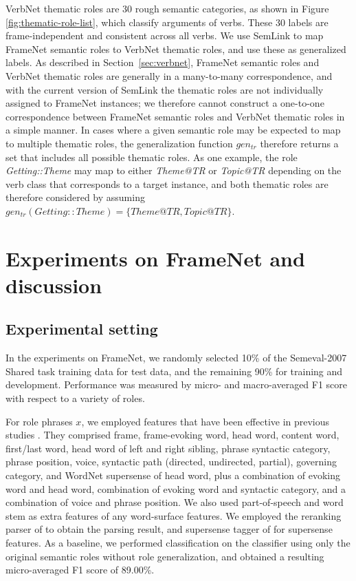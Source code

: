\documentclass[english]{jnlp_1.4_rep}
\begin{document}
VerbNet thematic roles are 30 rough semantic categories, as shown in Figure \ref{fig:thematic-role-list}, which classify arguments of verbs. These 30 labels are frame-independent and consistent across all verbs. We use SemLink to map FrameNet semantic roles to VerbNet thematic roles, and use these as generalized labels. As described in Section~\ref{sec:verbnet}, FrameNet semantic roles and VerbNet thematic roles are generally in a many-to-many correspondence, and with the current version of SemLink the thematic roles are not individually assigned to FrameNet instances; we therefore cannot construct a one-to-one correspondence between FrameNet semantic roles and VerbNet thematic roles in a simple manner. In cases where a given semantic role may be expected to map to multiple thematic roles, the generalization function $gen_{tr}$ therefore returns a set that includes all possible thematic roles. As one example, the role {\it Getting::Theme} may map to either {\it Theme@TR} or {\it Topic@TR} depending on the verb class that corresponds to a target instance, and both thematic roles are therefore considered by assuming $gen_{tr}(\mathit{Getting::Theme})=\{\mathit{Theme@TR}, \mathit{Topic@TR}\}$.


\section{Experiments on FrameNet and discussion}
\label{sec:experiment-in-framenet}

\subsection{Experimental setting}

In the experiments on FrameNet, we randomly selected 10\% of the Semeval-2007 Shared task training data \cite{baker-ellsworth-erk:2007:SemEval-2007} for test data, and the remaining 90\% for training and development. Performance was measured by micro- and macro-averaged F1 score \cite{chang2008kee} with respect to a variety of roles.

For role phrases $x$, we employed features that have been effective in previous studies \cite{marquez2008srl}. They comprised frame, frame-evoking word, head word, content word, first/last word, head word of left and right sibling, phrase syntactic category, phrase position, voice, syntactic path (directed, undirected, partial), governing category, and WordNet supersense of head word, plus a combination of evoking word and head word, combination of evoking word and syntactic category, and a combination of voice and phrase position. We also used part-of-speech and word stem as extra features of any word-surface features. We employed the reranking parser of  to obtain the parsing result, and supersense tagger of  for supersense features. As a baseline, we performed classification on the classifier using only the original semantic roles without role generalization, and obtained a resulting micro-averaged F1 score of 89.00\%.
\end{document}
